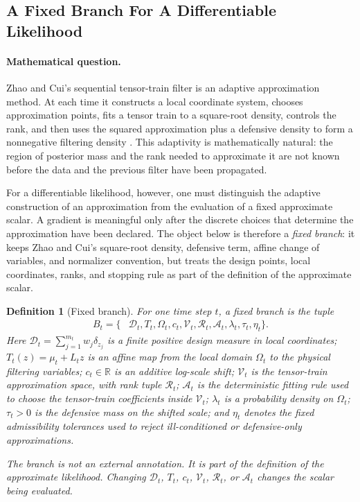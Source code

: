 \documentclass[11pt]{article}
\newtheorem{definition}{Definition}
\numberwithin{equation}{section}
\newcommand{\R}{\mathbb R}
\begin{document}
\subsection{A Fixed Branch For A Differentiable Likelihood}
\label{sec:p50-fixed-branch-likelihood}

\paragraph{Mathematical question.}
Zhao and Cui's sequential tensor-train filter is an adaptive approximation
method.  At each time it constructs a local coordinate system, chooses
approximation points, fits a tensor train to a square-root density, controls the
rank, and then uses the squared approximation plus a defensive density to form a
nonnegative filtering density \cite[Algorithm~2 and Eq.~(13)]{zhao2024ttsequential}.
This adaptivity is mathematically natural: the region of posterior mass and the
rank needed to approximate it are not known before the data and the previous
filter have been propagated.

For a differentiable likelihood, however, one must distinguish the adaptive
construction of an approximation from the evaluation of a fixed approximate
scalar.  A gradient is meaningful only after the discrete choices that determine
the approximation have been declared.  The object below is therefore a
\emph{fixed branch}: it keeps Zhao and Cui's square-root density, defensive
term, affine change of variables, and normalizer convention, but treats the
design points, local coordinates, ranks, and stopping rule as part of the
definition of the approximate scalar.

\begin{definition}[Fixed branch]
\label{def:p50-fixed-branch}
For one time step \(t\), a fixed branch is the tuple
\begin{equation}
\begin{aligned}
B_t=\{&
\mathcal D_t,T_t,\Omega_t,c_t,
\mathcal V_t,\mathcal R_t,\mathcal A_t,
\lambda_t,\tau_t,\eta_t\}.
\end{aligned}
\label{eq:p50-fixed-branch-tuple}
\end{equation}
Here \(\mathcal D_t=\sum_{j=1}^{m_t}w_j\delta_{z_j}\) is a finite positive
design measure in local coordinates; \(T_t(z)=\mu_t+L_tz\) is an affine map from
the local domain \(\Omega_t\) to the physical filtering variables; \(c_t\in\R\)
is an additive log-scale shift; \(\mathcal V_t\) is the tensor-train
approximation space, with rank tuple \(\mathcal R_t\); \(\mathcal A_t\) is the
deterministic fitting rule used to choose the tensor-train coefficients inside
\(\mathcal V_t\); \(\lambda_t\) is a probability density on \(\Omega_t\);
\(\tau_t>0\) is the defensive mass on the shifted scale; and \(\eta_t\) denotes
the fixed admissibility tolerances used to reject ill-conditioned or
defensive-only approximations.

The branch is not an external annotation.  It is part of the definition of the
approximate likelihood.  Changing \(\mathcal D_t\), \(T_t\), \(c_t\),
\(\mathcal V_t\), \(\mathcal R_t\), or \(\mathcal A_t\) changes the scalar being
evaluated.
\end{definition}
\end{document}
